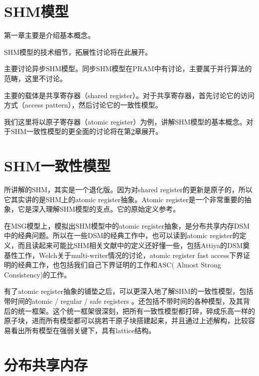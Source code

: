 \documentclass[UTF8]{ctexrep}
\begin{document}
\chapter{SHM模型} \label{Chap_SHM}

第一章主要是介绍基本概念。

SHM模型的技术细节，拓展性讨论将在此展开。

主要讨论异步SHM模型。同步SHM模型在PRAM中有讨论，主要属于并行算法的范畴，这里不讨论。

主要的载体是共享寄存器（shared register）。对于共享寄存器，首先讨论它的访问方式（access pattern），然后讨论它的一致性模型。

我们这里将以原子寄存器（atomic register）为例，讲解SHM模型的基本概念。对于SHM一致性模型的更全面的讨论将在第\ref{Chap_SHM-Consis}章展开。


\chapter{SHM一致性模型} \label{Chap_SHM-Consis}

\cite[Chap 4]{Attiya04}所讲解的SHM，其实是一个退化版。因为对shared register的更新是原子的，所以它其实讲的是SHM上的atomic register抽象。Atomic register是一个非常重要的抽象，它是深入理解SHM模型的支点。它的原始定义参考\cite{Lamport86a, Lamport86b}。

在MSG模型上，模拟出SHM模型中的atomic register抽象，是分布共享内存DSM中的经典问题。所以在一些DSM的经典工作中，也可以读到atomic register的定义，而且读起来可能比SHM相关文献中的定义还好懂一些，包括Attiya的DSM奠基性工作\cite{Attiya95}，Welch关于multi-writer情况的讨论\cite{Shao11}，atomic register fast access下界证明的经典工作\cite{Dutta10}，也包括我们自己下界证明的工作\cite{Huang20}和ASC( Almost Strong Consistency)的工作\cite{Wei17, Ouyang21}。

有了atomic register抽象的铺垫之后，可以更深入地了解SHM的一致性模型，包括带时间的atomic / regular / safe registers \cite{Lamport86a, Lamport86b, Shao11}。还包括不带时间的各种模型，及其背后的统一框架\cite{Steinke04}。这个统一框架很深刻，把所有一致性模型都打碎，碎成乐高一样的原子块，进而所有模型都可以挑若干原子块搭建起来，并且通过上述解构，比较容易看出所有模型在强弱关键下，具有lattice结构。


\chapter{分布共享内存}
\end{document}
